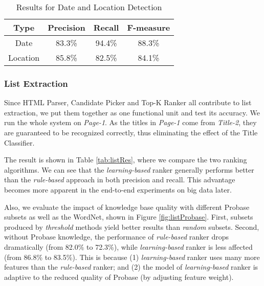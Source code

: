 \begin{table}
\centering
\caption{Results for Date and Location Detection}
\begin{tabular}{|c||c|c|c|}
\hline
Type  & Precision & Recall &  F-measure \\\hline
Date  & 83.3\% & 94.4\% & 88.3\%\\
Location & 85.8\% & 82.5\% & 84.1\%\\
\hline
\end{tabular}

\label{tab:whRes}
\end{table}

\subsubsection{List Extraction}

\label{sec:evalList}

Since HTML Parser, Candidate Picker and Top-K Ranker all
contribute to list extraction, we put them together as one functional
unit and test its accuracy.
We run the whole system on \emph{Page-1}.
As the titles in \emph{Page-1} come from \emph{Title-2},
they are guaranteed to be recognized correctly,
thus eliminating the effect of the Title Classifier.

The result is shown in Table \ref{tab:listRes},
where we compare the two ranking algorithms.
We can see that the \emph{learning-based} ranker generally performs
better than the \emph{rule-based} approach in both precision and
recall. This advantage becomes more apparent in the
end-to-end experiments on big data later.

Also, we evaluate the impact of knowledge base quality with
different Probase subsets as well as the WordNet,
shown in Figure \ref{fig:listProbase}.
First, subsets produced by \emph{threshold} methods yield better results
than \emph{random} subsets.
Second, without Probase knowledge,
the performance of \emph{rule-based} ranker drops dramatically
(from 82.0\% to 72.3\%), while \emph{learning-based} ranker is
less affected (from 86.8\% to 83.5\%).
This is because (1) \emph{learning-based} ranker uses many more features
than the \emph{rule-based} ranker;
and (2) the model of \emph{learning-based} ranker is adaptive to
the reduced quality of Probase (by adjusting feature weight).

